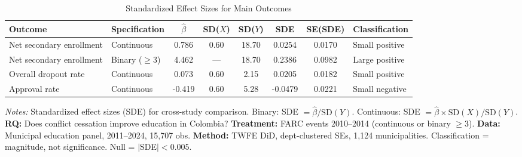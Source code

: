 \begin{table}[H]
\centering
\caption{Standardized Effect Sizes for Main Outcomes}
\label{tab:sde}
\footnotesize
\begin{adjustbox}{max width=\textwidth}
\begin{threeparttable}
\begin{tabular}{llcccccl}
\toprule
Outcome & Specification & $\hat{\beta}$ & SD($X$) & SD($Y$) & SDE & SE(SDE) & Classification \\
\midrule
Net secondary enrollment & Continuous & 0.786 & 0.60 & 18.70 & 0.0254 & 0.0170 & Small positive \\
Net secondary enrollment & Binary ($\geq$3) & 4.462 & --- & 18.70 & 0.2386 & 0.0982 & Large positive \\
Overall dropout rate & Continuous & 0.073 & 0.60 & 2.15 & 0.0205 & 0.0182 & Small positive \\
Approval rate & Continuous & -0.419 & 0.60 & 5.28 & -0.0479 & 0.0221 & Small negative \\
\bottomrule
\end{tabular}
\begin{tablenotes}[flushleft]
\scriptsize
\item \textit{Notes:} Standardized effect sizes (SDE) for cross-study comparison. Binary: SDE $= \hat{\beta} / \text{SD}(Y)$. Continuous: SDE $= \hat{\beta} \times \text{SD}(X) / \text{SD}(Y)$.
\textbf{RQ:} Does conflict cessation improve education in Colombia?
\textbf{Treatment:} FARC events 2010--2014 (continuous or binary $\geq$3).
\textbf{Data:} Municipal education panel, 2011--2024, 15,707 obs.
\textbf{Method:} TWFE DiD, dept-clustered SEs, 1,124 municipalities.
Classification = magnitude, not significance. Null = $|$SDE$| < 0.005$.
\end{tablenotes}
\end{threeparttable}
\end{adjustbox}
\end{table}
